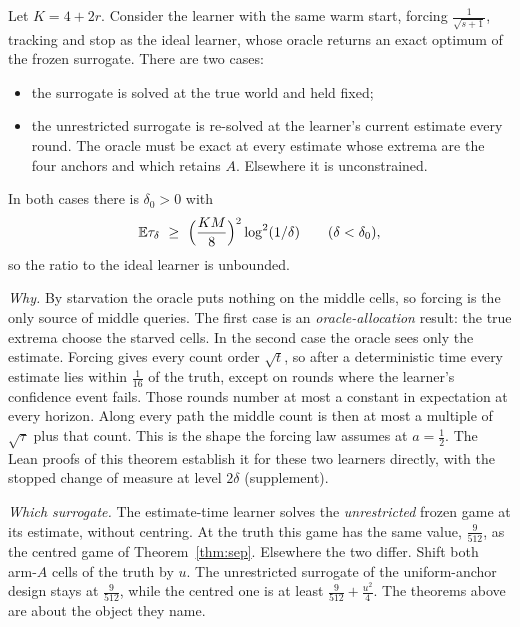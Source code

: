 \begin{theorem}
\label{thm:surlearner}
Let $K=4+2r$. Consider the learner with the same warm start, forcing $\frac{1}{\sqrt{s+1}}$,
tracking and stop as the ideal learner, whose oracle returns an exact optimum of the frozen
surrogate. There are two cases:
\begin{itemize}
\item the surrogate is solved at the true world and held fixed;
\item the unrestricted surrogate is re-solved at the learner's current estimate every round.
The oracle must be exact at every estimate whose extrema are the four anchors and which
retains $A$. Elsewhere it is unconstrained.
\end{itemize}
In both cases there is $\delta_{0}>0$ with
\[
\mathbb{E}\tau_{\delta}\ \ge\ \Bigl(\frac{KM}{8}\Bigr)^{2}\log^{2}(1/\delta)
\qquad(\delta<\delta_{0}),
\]
so the ratio to the ideal learner is unbounded.
\end{theorem}


\emph{Why.} By starvation the oracle puts nothing on the middle cells, so forcing is the only
source of middle queries. The first case is an \emph{oracle-allocation} result: the true
extrema choose the starved cells. In the second case the oracle sees only the estimate. Forcing
gives every count order $\sqrt t$, so after a deterministic time every estimate lies within
$\frac1{16}$ of the truth, except on rounds where the learner's confidence event fails. Those
rounds number at most a constant in expectation at every horizon. Along every path the middle
count is then at most a multiple of $\sqrt{\tau}$ plus that count. This is the shape the
forcing law assumes at $a=\frac12$. The Lean proofs of this theorem establish it for these two
learners directly, with the stopped change of measure at level $2\delta$ (supplement).

\emph{Which surrogate.} The estimate-time learner solves the \emph{unrestricted} frozen game at
its estimate, without centring. At the truth this game has the same value, $\frac{9}{512}$, as
the centred game of Theorem~\ref{thm:sep}. Elsewhere the two differ. Shift both arm-$A$ cells
of the truth by $u$. The unrestricted surrogate of the uniform-anchor design stays at
$\frac{9}{512}$, while the centred one is at least $\frac{9}{512}+\frac{u^{2}}{4}$. The
theorems above are about the object they name.

